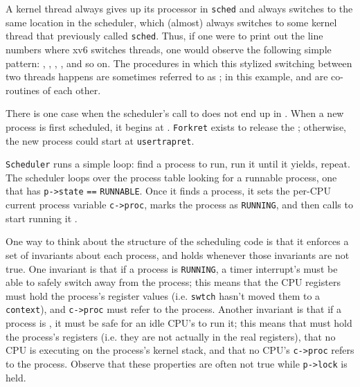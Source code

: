A kernel thread always gives up its
processor in
\lstinline{sched} 
and always switches to the same location in the scheduler, which
(almost) always switches to some kernel thread that previously called
\lstinline{sched}. 
Thus, if one were to print out the line numbers where xv6 switches
threads, one would observe the following simple pattern:
,
,
,
,
and so on.  The procedures in which this stylized switching between
two threads happens are sometimes referred to as 
; 
in this example,
and
are co-routines of each other.

There is one case when the scheduler's call to
does not end up in
.
When a new process is first scheduled, it begins at
.
\lstinline{Forkret}
exists to release the 
;
otherwise, the new process could start at
\lstinline{usertrapret}.

\lstinline{Scheduler}
runs a simple loop:
find a process to run, run it until it yields, repeat.
The scheduler
loops over the process table
looking for a runnable process, one that has
\lstinline{p->state} 
\lstinline{==}
\lstinline{RUNNABLE}.
Once it finds a process, it sets the per-CPU current process
variable
\lstinline{c->proc},
marks the process as
\lstinline{RUNNING},
and then calls
to start running it
.

One way to think about the structure of the scheduling code is
that it enforces a set of invariants about each process,
and holds
whenever those invariants are not true.
One invariant is that if a process is
\lstinline{RUNNING},
a timer interrupt's
must be able to safely switch away from the process;
this means that the CPU registers must hold the process's register values
(i.e. 
\lstinline{swtch}
hasn't moved them to a
\lstinline{context}),
and
\lstinline{c->proc}
must refer to the process.
Another invariant is that if a process is
,
it must be safe for
an idle CPU's
to run it;
this means that 
must hold the process's registers (i.e. they are
not actually in the real registers),
that no CPU is executing on the process's kernel stack,
and that no CPU's
\lstinline{c->proc}
refers to the process.
Observe that these properties are often not true while
\lstinline{p->lock} is held.

